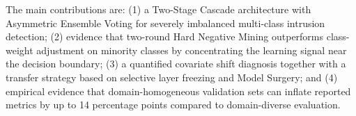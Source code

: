 \documentclass[../DoAn.tex]{subfiles}
\begin{document}
The main contributions are: (1) a Two-Stage Cascade architecture with Asymmetric Ensemble Voting for severely imbalanced multi-class intrusion detection; (2) evidence that two-round Hard Negative Mining outperforms class-weight adjustment on minority classes by concentrating the learning signal near the decision boundary; (3) a quantified covariate shift diagnosis together with a transfer strategy based on selective layer freezing and Model Surgery; and (4) empirical evidence that domain-homogeneous validation sets can inflate reported metrics by up to 14 percentage points compared to domain-diverse evaluation.
\end{document}
